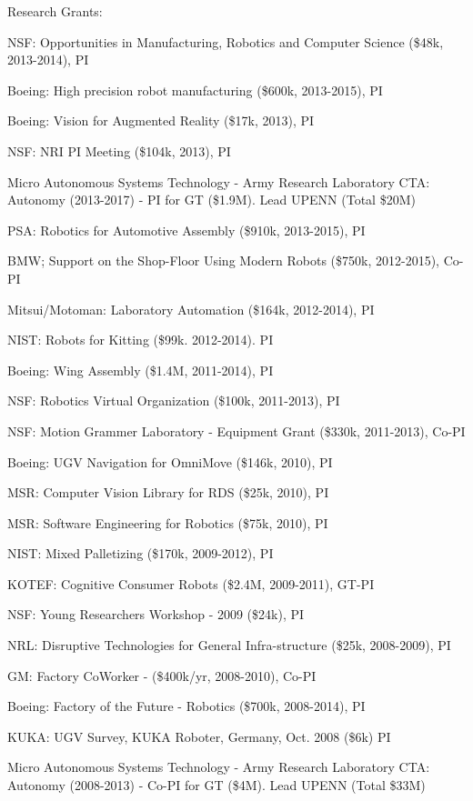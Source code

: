 \documentclass{article}
\begin{document}
\begin{cv}
\begin{cvlist}{Research Grants:}
\item NSF: Opportunities in Manufacturing, Robotics and Computer Science
  (\$48k, 2013-2014), PI
\item Boeing: High precision robot manufacturing (\$600k, 2013-2015), PI
\item Boeing: Vision for Augmented Reality (\$17k, 2013), PI
\item NSF: NRI PI Meeting (\$104k, 2013), PI
\item Micro Autonomous Systems Technology - Army Research Laboratory
  CTA: Autonomy (2013-2017) - PI for GT (\$1.9M). Lead UPENN (Total
  \$20M) %
\item PSA: Robotics for Automotive Assembly (\$910k, 2013-2015), PI
\item BMW; Support on the Shop-Floor Using Modern Robots (\$750k,
  2012-2015), Co-PI
\item Mitsui/Motoman: Laboratory Automation (\$164k, 2012-2014), PI
\item NIST: Robots for Kitting (\$99k. 2012-2014). PI
\item Boeing: Wing Assembly (\$1.4M, 2011-2014), PI
\item NSF: Robotics Virtual Organization (\$100k, 2011-2013), PI
\item NSF: Motion Grammer Laboratory - Equipment Grant (\$330k, 2011-2013), Co-PI
\item Boeing: UGV Navigation for OmniMove (\$146k, 2010), PI
\item MSR: Computer Vision Library for RDS (\$25k, 2010), PI
\item MSR: Software Engineering for Robotics (\$75k, 2010), PI
\item NIST: Mixed Palletizing (\$170k, 2009-2012), PI
\item KOTEF: Cognitive Consumer Robots (\$2.4M, 2009-2011), GT-PI
\item NSF: Young Researchers Workshop - 2009 (\$24k), PI
\item NRL: Disruptive Technologies for General Infra-structure  (\$25k, 2008-2009), PI
\item GM: Factory CoWorker - (\$400k/yr, 2008-2010), Co-PI
\item Boeing: Factory of the Future - Robotics (\$700k, 2008-2014), PI
\item KUKA: UGV Survey, KUKA Roboter, Germany, Oct. 2008 (\$6k)  PI%
\item Micro Autonomous Systems Technology - Army Research Laboratory
  CTA: Autonomy (2008-2013) - Co-PI for GT (\$4M). Lead UPENN (Total \$33M) %

\end{cvlist}
\end{cv}
\end{document}

